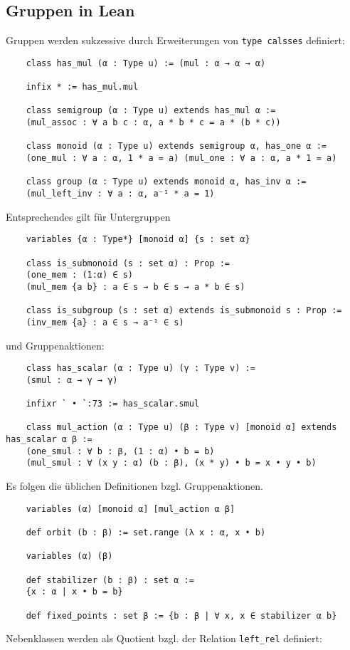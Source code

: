 \documentclass[a4paper,12pt]{scrartcl}
\begin{document}
	\subsection{Gruppen in Lean}
	Gruppen werden sukzessive durch Erweiterungen von \lstinline|type calsses| definiert:
	\begin{lstlisting}
	class has_mul (α : Type u) := (mul : α → α → α)
	
	infix * := has_mul.mul
	
	class semigroup (α : Type u) extends has_mul α :=
	(mul_assoc : ∀ a b c : α, a * b * c = a * (b * c))
	
	class monoid (α : Type u) extends semigroup α, has_one α :=
	(one_mul : ∀ a : α, 1 * a = a) (mul_one : ∀ a : α, a * 1 = a)
	
	class group (α : Type u) extends monoid α, has_inv α :=
	(mul_left_inv : ∀ a : α, a⁻¹ * a = 1)
	\end{lstlisting}
	Entsprechendes gilt für Untergruppen
	\begin{lstlisting}
	variables {α : Type*} [monoid α] {s : set α}
	
	class is_submonoid (s : set α) : Prop :=
	(one_mem : (1:α) ∈ s)
	(mul_mem {a b} : a ∈ s → b ∈ s → a * b ∈ s)
	
	class is_subgroup (s : set α) extends is_submonoid s : Prop :=
	(inv_mem {a} : a ∈ s → a⁻¹ ∈ s)
	\end{lstlisting}
	und Gruppenaktionen:
	\begin{lstlisting}
	class has_scalar (α : Type u) (γ : Type v) := 
	(smul : α → γ → γ)

	infixr ` • `:73 := has_scalar.smul
	
	class mul_action (α : Type u) (β : Type v) [monoid α] extends has_scalar α β :=
	(one_smul : ∀ b : β, (1 : α) • b = b)
	(mul_smul : ∀ (x y : α) (b : β), (x * y) • b = x • y • b)
	\end{lstlisting}
	Es folgen die üblichen Definitionen bzgl. Gruppenaktionen.
	\begin{lstlisting}
	variables (α) [monoid α] [mul_action α β]
	
	def orbit (b : β) := set.range (λ x : α, x • b)
	
	variables (α) (β)
	
	def stabilizer (b : β) : set α :=
	{x : α | x • b = b}
	
	def fixed_points : set β := {b : β | ∀ x, x ∈ stabilizer α b}
	\end{lstlisting}
	Nebenklassen werden als Quotient bzgl. der Relation \lstinline|left_rel| definiert:
\end{document}
